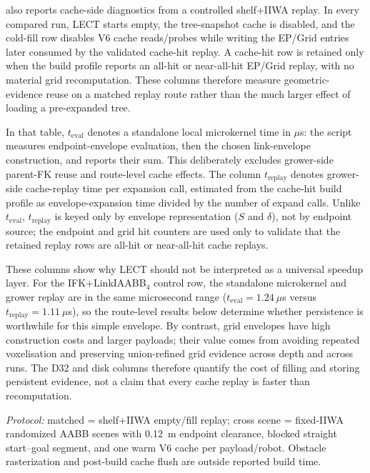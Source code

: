 \documentclass[journal]{IEEEtran}
\begin{document}
 also reports cache-side diagnostics from a
controlled shelf+IIWA replay. In every compared run, LECT starts empty, the
tree-snapshot cache is disabled, and the cold-fill row disables V6 cache
reads/probes while writing the EP/Grid entries later consumed by the validated
cache-hit replay. A cache-hit row is retained only when the build profile reports an
all-hit or near-all-hit EP/Grid replay, with no material grid recomputation.
These columns therefore measure
geometric-evidence reuse on a matched replay route rather than the much larger
effect of loading a pre-expanded tree.

In that table, $t_{\mathrm{eval}}$ denotes a standalone local microkernel time
in $\mu$s: the script measures endpoint-envelope evaluation, then the chosen
link-envelope construction, and reports their sum. This deliberately excludes
grower-side parent-FK reuse and route-level cache effects. The column
$t_{\mathrm{replay}}$ denotes grower-side cache-replay time per expansion call,
estimated from the cache-hit build profile as envelope-expansion time divided
by the number of expand calls. Unlike $t_{\mathrm{eval}}$,
$t_{\mathrm{replay}}$ is keyed only by envelope representation ($S$ and
$\delta$), not by endpoint source; the endpoint and grid hit counters are used
only to validate that the retained replay rows are all-hit or near-all-hit
cache replays.

These columns show why LECT should not be interpreted as a universal speedup
layer. For the IFK+LinkIAABB$_4$ control row, the standalone microkernel and
grower replay are in the same microsecond range
($t_{\mathrm{eval}}=1.24~\mu$s versus
$t_{\mathrm{replay}}=1.11~\mu$s), so the route-level results below determine
whether persistence is worthwhile for this simple envelope. By contrast, grid
envelopes have high construction costs and larger payloads; their value comes
from avoiding repeated voxelisation and preserving union-refined grid evidence
across depth and across runs. The D32 and disk columns therefore quantify the
cost of filling and storing persistent evidence, not a claim that every cache
replay is faster than recomputation.

\FloatBarrier
\begin{table}[!htbp]
  \centering
  \caption{LECT cache reuse and storage footprint for retained envelope payloads.}
  \label{tab:marcucci_envelope_build}
  \scriptsize
  \setlength{\tabcolsep}{1.6pt}
  \resizebox{\columnwidth}{!}{}
  \vspace{1pt}
  \parbox{0.96\columnwidth}{\scriptsize\emph{Protocol:} matched = shelf+IIWA empty/fill replay; cross scene = fixed-IIWA randomized AABB scenes with 0.12~m endpoint clearance, blocked straight start--goal segment, and one warm V6 cache per payload/robot. Obstacle rasterization and post-build cache flush are outside reported build time.}
\end{table}
\end{document}
